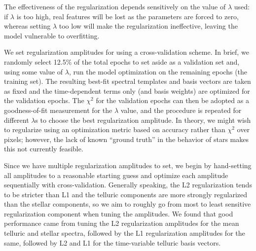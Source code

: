 \documentclass[twocolumn]{aastex62}
\begin{document}
The effectiveness of the regularization depends sensitively on the value of $\lambda$ used: if $\lambda$ is too high, real features will be lost as the parameters are forced to zero, whereas setting $\lambda$ too low will make the regularization ineffective, leaving the model vulnerable to overfitting. 

We set regularization amplitudes for \wobble using a cross-validation scheme. 
In brief, we randomly select 12.5\% of the total epochs to set aside as a validation set and, using some value of $\lambda$, run the model optimization on the remaining epochs (the training set). 
The resulting best-fit spectral templates and basis vectors are taken as fixed and the time-dependent terms only (\RVs and basis weights) are optimized for the validation epochs. 
The $\chi^2$ for the validation epochs can then be adopted as a goodness-of-fit measurement for the $\lambda$ value, and the procedure is repeated for different $\lambda$s to choose the best regularization amplitude. 
In theory, we might wish to regularize using an optimization metric based on \RV accuracy rather than $\chi^2$ over pixels; however, the lack of known ``ground truth'' in the \RV behavior of stars makes this not currently feasible. 

Since we have multiple regularization amplitudes to set, we begin by hand-setting all amplitudes to a reasonable starting guess and optimize each amplitude sequentially with cross-validation. 
Generally speaking, the L2 regularization tends to be stricter than L1 and the telluric components are more strongly regularized than the stellar components, so we aim to roughly go from most to least sensitive regularization component when tuning the amplitudes.
We found that good performance came from tuning the L2 regularization amplitudes for the mean telluric and stellar spectra, followed by the L1 regularization amplitudes for the same, followed by L2 and L1 for the time-variable telluric basis vectors. 
\end{document}
